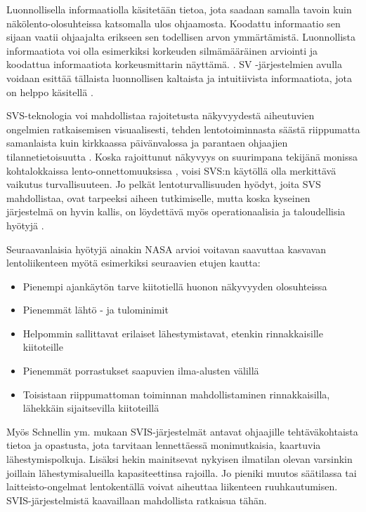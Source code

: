 \documentclass[utf8,bachelor,manualbib]{gradu3}
\begin{document}
Luonnollisella informaatiolla käsitetään tietoa, jota saadaan samalla tavoin kuin näkölento-olosuhteissa katsomalla ulos ohjaamosta. Koodattu informaatio sen sijaan vaatii ohjaajalta erikseen sen todellisen arvon ymmärtämistä. Luonnollista informaatiota voi olla esimerkiksi korkeuden silmämääräinen arviointi ja koodattua informaatiota korkeusmittarin näyttämä. \citep{prinzel2004}. SV -järjestelmien avulla voidaan esittää tällaista luonnollisen kaltaista ja intuitiivista informaatiota, jota on helppo käsitellä \citep{wickensandre1990}.

SVS-teknologia voi mahdollistaa rajoitetusta näkyvyydestä aiheutuvien ongelmien ratkaisemisen visuaalisesti, tehden lentotoiminnasta säästä riippumatta samanlaista kuin kirkkaassa päivänvalossa ja parantaen ohjaajien tilannetietoisuutta \citep{prinzel2004}. Koska rajoittunut näkyvyys on suurimpana tekijänä monissa kohtalokkaissa lento-onnettomuuksissa \citep{boeing1996}, voisi SVS:n käytöllä olla merkittävä vaikutus turvallisuuteen. Jo pelkät lentoturvallisuuden hyödyt, joita SVS mahdollistaa, ovat tarpeeksi aiheen tutkimiselle, mutta koska kyseinen järjestelmä on hyvin kallis, on löydettävä myös operationaalisia ja taloudellisia hyötyjä \citep{prinzel2004}.

Seuraavanlaisia hyötyjä ainakin NASA \citeyearpar{williamsym2001} arvioi voitavan saavuttaa kasvavan lentoliikenteen myötä esimerkiksi seuraavien etujen kautta:

\begin{itemize}
\item Pienempi ajankäytön tarve kiitotiellä huonon näkyvyyden olosuhteissa
\item Pienemmät lähtö - ja tulominimit
\item Helpommin sallittavat erilaiset lähestymistavat, etenkin rinnakkaisille kiitoteille
\item Pienemmät porrastukset saapuvien ilma-alusten välillä
\item Toisistaan riippumattoman toiminnan mahdollistaminen rinnakkaisilla, lähekkäin sijaitsevilla kiitoteillä
\end{itemize} 

Myös Schnellin ym. \citeyearpar{schnellym2004} mukaan SVIS-järjestelmät antavat ohjaajille tehtäväkohtaista tietoa ja opastusta, jota tarvitaan lennettäessä monimutkaisia, kaartuvia lähestymispolkuja. Lisäksi hekin mainitsevat nykyisen ilmatilan olevan varsinkin joillain lähestymisalueilla kapasiteettinsa rajoilla. Jo pieniki muutos säätilassa tai laitteisto-ongelmat lentokentällä voivat aiheuttaa liikenteen ruuhkautumisen. SVIS-järjestelmistä kaavaillaan mahdollista ratkaisua tähän.
\end{document}
